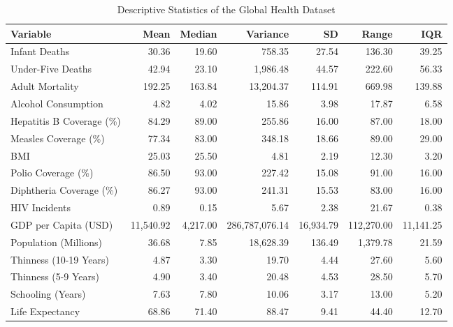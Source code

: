 \documentclass[3pt, a4paper]{article}
\begin{document}
\begin{table}[H]
    \centering
    \caption{Descriptive Statistics of the Global Health Dataset}
    \label{tab:descriptive_stats}
    \small %
    \begin{tabular}{lrrrrrr}
        \toprule
        \textbf{Variable} & \textbf{Mean} & \textbf{Median} & \textbf{Variance} & \textbf{SD} & \textbf{Range} & \textbf{IQR} \\
        \midrule
        Infant Deaths & 30.36 & 19.60 & 758.35 & 27.54 & 136.30 & 39.25 \\
        Under-Five Deaths & 42.94 & 23.10 & 1,986.48 & 44.57 & 222.60 & 56.33 \\
        Adult Mortality & 192.25 & 163.84 & 13,204.37 & 114.91 & 669.98 & 139.88 \\
        Alcohol Consumption & 4.82 & 4.02 & 15.86 & 3.98 & 17.87 & 6.58 \\
        Hepatitis B Coverage (\%) & 84.29 & 89.00 & 255.86 & 16.00 & 87.00 & 18.00 \\
        Measles Coverage (\%) & 77.34 & 83.00 & 348.18 & 18.66 & 89.00 & 29.00 \\
        BMI & 25.03 & 25.50 & 4.81 & 2.19 & 12.30 & 3.20 \\
        Polio Coverage (\%) & 86.50 & 93.00 & 227.42 & 15.08 & 91.00 & 16.00 \\
        Diphtheria Coverage (\%) & 86.27 & 93.00 & 241.31 & 15.53 & 83.00 & 16.00 \\
        HIV Incidents & 0.89 & 0.15 & 5.67 & 2.38 & 21.67 & 0.38 \\
        GDP per Capita (USD) & 11,540.92 & 4,217.00 & 286,787,076.14 & 16,934.79 & 112,270.00 & 11,141.25 \\
        Population (Millions) & 36.68 & 7.85 & 18,628.39 & 136.49 & 1,379.78 & 21.59 \\
        Thinness (10-19 Years) & 4.87 & 3.30 & 19.70 & 4.44 & 27.60 & 5.60 \\
        Thinness (5-9 Years) & 4.90 & 3.40 & 20.48 & 4.53 & 28.50 & 5.70 \\
        Schooling (Years) & 7.63 & 7.80 & 10.06 & 3.17 & 13.00 & 5.20 \\
        Life Expectancy & 68.86 & 71.40 & 88.47 & 9.41 & 44.40 & 12.70 \\
        \bottomrule
    \end{tabular}
\end{table}
\end{document}
